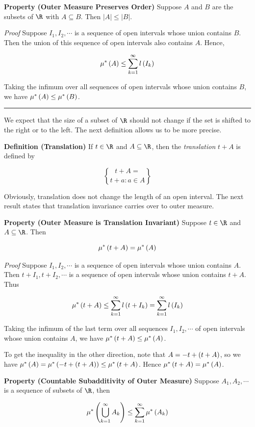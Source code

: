 \documentclass[
]{article}
\begin{document}
\textbf{Property (Outer Measure Preserves Order)} Suppose \(A\) and
\(B\) are the subsets of \(\R\) with \(A \subseteq B\). Then
\(|A|\le |B|\).

\emph{Proof} Suppose \(I_1,I_2,\cdots\) is a sequence of open intervals
whose union contains \(B\). Then the union of this sequence of open
intervals also contains \(A\). Hence,

\[\mu^*\left(A\right)\le \sum_{k = 1}^{\infty}l\left(I_k\right)\]

Taking the infimum over all sequences of open intervals whose union
contains \(B\), we have \(\mu^*\left(A\right)\le \mu^*\left(B\right)\).

\begin{center}\rule{0.5\linewidth}{0.5pt}\end{center}

We expect that the size of a subset of \(\R\) should not change if the
set is shifted to the right or to the left. The next definition allows
us to be more precise.

\textbf{Definition (Translation)} If \(t\in \R\) and \(A\se \R\), then
the \emph{translation} \(t+A\) is defined by

\[t+A = \brace{t+a:a\in A}\]

Obviously, translation does not change the length of an open interval.
The next result states that translation invariance carries over to outer
measure.

\textbf{Property (Outer Measure is Translation Invariant)} Suppose
\(t\in \R\) and \(A\se \R\). Then

\[\mu^*\left(t+A\right) = \mu^*\left(A\right)\]

\emph{Proof} Suppose \(I_1,I_2,\cdots\) is a sequence of open intervals
whose union contains \(A\). Then \(t+I_1,t+I_2,\cdots\) is a sequence of
open intervals whose union contains \(t+A\). Thus

\[\mu^*\left(t+A\right) \le \sum_{k = 1}^{\infty}l\left(t+I_k\right) = \sum_{k = 1}^{\infty}l\left(I_k\right)\]

Taking the infimum of the last term over all sequences
\(I_1,I_2,\cdots\) of open intervals whose union contains \(A\), we have
\(\mu^*\left(t+A\right)\le \mu^*\left(A\right)\).

To get the inequality in the other direction, note that
\(A = -t+\left(t+A\right)\), so we have
\(\mu^*\left(A\right) = \mu^*\left(-t+\left(t+A\right)\right) \le \mu^*\left(t+A\right)\). Hence \(\mu^*\left(t+A\right) = \mu^*\left(A\right)\).

\textbf{Property (Countable Subadditivity of Outer Measure)} Suppose
\(A_1,A_2,\cdots\) is a sequence of subsets of \(\R\), then

\[\mu^*\left(\bigcup_{k = 1}^{\infty}A_k\right)\le \sum_{k = 1}^{\infty}\mu^*\left(A_k\right)\]
\end{document}
